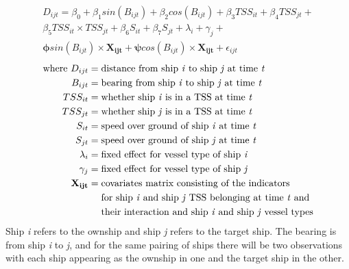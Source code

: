\documentclass[twoside,symmetric,notoc]{tufte-book}
\begin{document}
{\begin{multline*}
D_{ijt} = \beta_0 + \beta_1 sin(B_{ijt}) + \beta_2 cos(B_{ijt}) + \beta_3 TSS_{it} + \beta_4 TSS_{jt} + \\ \beta_5 TSS_{it} \times TSS_{jt} + \beta_6 S_{it} + \beta_7 S_{jt} + \lambda_i + \gamma_j + \\
\boldsymbol{\phi} sin(B_{ijt}) \times \mathbf{X_{ijt}} + \boldsymbol{\psi} cos(B_{ijt}) \times \mathbf{X_{ijt}}  + \epsilon_{ijt}
\end{multline*}
\begin{align*}
\text{where}~D_{ijt}    &= \text{distance from ship \textit{i} to ship \textit{j} at time \textit{t}}      \\
    B_{ijt}             &= \text{bearing from ship \textit{i} to ship \textit{j} at time \textit{t}}       \\
    TSS_{it}            &= \text{whether ship \textit{i} is in a TSS at time \textit{t}}          \\
    TSS_{jt}            &= \text{whether ship \textit{j} is in a TSS at time \textit{t}}          \\
    S_{it}              &= \text{speed over ground of ship \textit{i} at time \textit{t}}         \\
    S_{jt}              &= \text{speed over ground of ship \textit{j} at time \textit{t}}         \\
    \lambda_{i}         &= \text{fixed effect for vessel type of ship \textit{i}} \\
    \gamma_{j}         &= \text{fixed effect for vessel type of ship \textit{j}} \\
    \mathbf{X_{ijt}}    &= \begin{aligned}[t]
                            &\text{covariates matrix consisting of the indicators}\\
                            &\text{for ship \textit{i} and ship \textit{j} TSS belonging at  time \textit{t} and}\\
                            &\text{their interaction and ship \textit{i} and ship \textit{j} vessel types}\\
                        \end{aligned}  
\end{align*}
Ship \textit{i} refers to the ownship and ship \textit{j} refers to the target ship. The bearing is from ship \textit{i} to \textit{j}, and for the same pairing of ships there will be two observations with each ship appearing as the ownship in one and the target ship in the other. 
}
\end{document}
